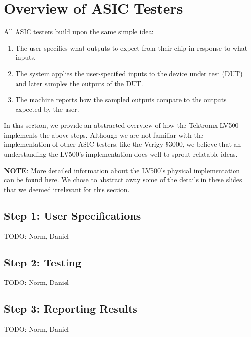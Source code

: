 \section{Overview of ASIC Testers}
All ASIC testers build upon the same simple idea: 
\begin{enumerate}
\item The user specifies what outputs to expect from their chip in response to what inputs.
\item The system applies the user-specified inputs to the device under test (DUT) and later samples the outputs of the DUT.
\item The machine reports how the sampled outputs compare to the outputs expected by the user.
\end{enumerate}

In this section, we provide an abstracted overview of how the Tektronix LV500 implements the above steps. Although we are not familiar with the implementation of other ASIC testers, like the Verigy 93000, we believe that an understanding the LV500's implementation does well to sprout relatable ideas. 

\textbf{NOTE}: More detailed information about the LV500's physical implementation can be found \href{https://view.officeapps.live.com/op/view.aspx?src=http://www.ece.utah.edu/~kstevens/6712/tester.ppt}{here}. We chose to abstract away  some of the details in these slides that we deemed irrelevant for this section.

\subsection{Step 1: User Specifications}
TODO: Norm, Daniel

\subsection{Step 2: Testing}
TODO: Norm, Daniel

\subsection{Step 3: Reporting Results}
TODO: Norm, Daniel

\newpage
